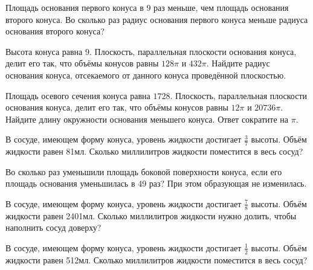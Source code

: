 \documentclass[a4paper]{article}
\begin{document}
\begin{taskBN}{8}
Площадь основания первого конуса в 9 раз меньше, чем площадь основания второго конуса. Во сколько раз радиус основания первого конуса меньше радиуса основания второго конуса?
\end{taskBN}

\begin{taskBN}{9}
Высота конуса равна $9$. Плоскость, параллельная плоскости основания конуса,  делит его так, что объёмы конусов равны $128\pi$ и $432\pi$. Найдите радиус основания конуса, отсекаемого от данного конуса проведённой плоскостью. 
\end{taskBN}

\begin{taskBN}{10}
Площадь осевого сечения конуса равна $1728$. Плоскость, параллельная плоскости основания конуса,  делит его так, что объёмы конусов равны $12\pi$ и $20736\pi$. Найдите длину окружности основания меньшего конуса. Ответ сократите на $\pi$.
\end{taskBN}

\begin{taskBN}{11}
В сосуде, имеющем форму конуса, уровень жидкости достигает $\frac{3}{7}$ высоты. Объём жидкости равен 81мл. Сколько миллилитров жидкости поместится в весь сосуд?
\end{taskBN}

\begin{taskBN}{12}
Во сколько раз уменьшили площадь боковой поверхности конуса, если его площадь основания уменьшилась в 49 раз? При этом образующая не изменилась.
\end{taskBN}

\begin{taskBN}{13}
В сосуде, имеющем форму конуса, уровень жидкости достигает $\frac{7}{8}$ высоты. Объём жидкости равен 2401мл. Сколько миллилитров жидкости нужно долить, чтобы наполнить сосуд доверху?
\end{taskBN}

\begin{taskBN}{14}
В сосуде, имеющем форму конуса, уровень жидкости достигает $\frac{1}{2}$ высоты. Объём жидкости равен 512мл. Сколько миллилитров жидкости поместится в весь сосуд?
\end{taskBN}
\end{document}
